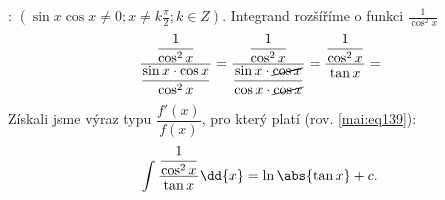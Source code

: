 \begin{mdframed}[style=mdmathsolution] 
  [\ref{mai:eq151}]: \((\sin x\cos x\neq0; x\neq k\frac{\pi}{2}; k\in Z)\). Integrand rozšíříme o
  funkci \(\frac{1}{\cos^2x}\)
  \begin{equation*}
    \dfrac{\dfrac{1}{\cos^2x}}{\dfrac{\sin x\cdot\cos x}{\cos^2x}}  = 
    \dfrac{\dfrac{1}{\cos^2x}}{\dfrac{\sin x\cdot\cancel{\cos x}}{\cos x\cdot\cancel{\cos x}}} = 
    \dfrac{\dfrac{1}{\cos^2x}}{\tan x} = 
  \end{equation*}  
  Získali jsme výraz typu \(\dfrac{f'(x)}{f(x)}\), pro který platí (rov. \ref{mai:eq139}):  
  \begin{equation*}
    \int\dfrac{\dfrac{1}{\cos^2x}}{\tan x}\dd{x} = \ln\abs{\tan x} + c.
  \end{equation*}    
\end{mdframed}